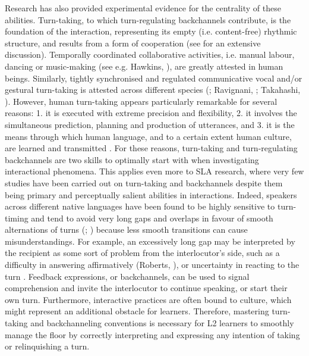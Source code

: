 Research has also provided experimental evidence for the centrality of these abilities. Turn-taking, to which turn-regulating backchannels contribute, is the foundation of the interaction, representing its empty (i.e. content-free) rhythmic structure, and results from a form of cooperation (see \citealt{Wehrle2023} for an extensive discussion). Temporally coordinated collaborative activities, i.e. manual labour, dancing or music-making (see e.g. Hawkins, \citealt{CrossOgden2013}), are greatly attested in human beings. Similarly, tightly synchronised and regulated communicative vocal and/or gestural turn-taking is attested across different species (\citealt{PikaEtAl2018}; Ravignani, \citealt{VergaGreenfield2019}; Takahashi, \citealt{FenleyGhazanfar2016}). However, human turn-taking appears particularly remarkable for several reasons: 1. it is executed with extreme precision and flexibility, 2. it involves the simultaneous prediction, planning and production of utterances, and 3. it is the means through which human language, and to a certain extent human culture, are learned and transmitted \citep{Schegloff2006}. For these reasons, turn-taking and turn-regulating backchannels are two skills to optimally start with when investigating interactional phenomena. This applies even more to SLA research, where very few studies have been carried out on turn-taking and backchannels despite them being primary and perceptually salient abilities in interactions. Indeed, speakers across different native languages have been found to be highly sensitive to turn-timing and tend to avoid very long gaps and overlaps in favour of smooth alternations of turns (\citealt{LevinsonTorreira2015}; \citealt{StiversEtAl2009}) because less smooth transitions can cause misunderstandings. For example, an excessively long gap may be interpreted by the recipient as some sort of problem from the interlocutor’s side, such as a difficulty in answering affirmatively (Roberts, \citealt{MarguttiTakano2011}), or uncertainty in reacting to the turn \citep{Levinson1983}. Feedback expressions, or backchannels, can be used to signal comprehension and invite the interlocutor to continue speaking, or start their own turn. Furthermore, interactive practices are often bound to culture, which might represent an additional obstacle for learners. Therefore, mastering turn-taking and backchanneling conventions is necessary for L2 learners to smoothly manage the floor by correctly interpreting and expressing any intention of taking or relinquishing a turn.

